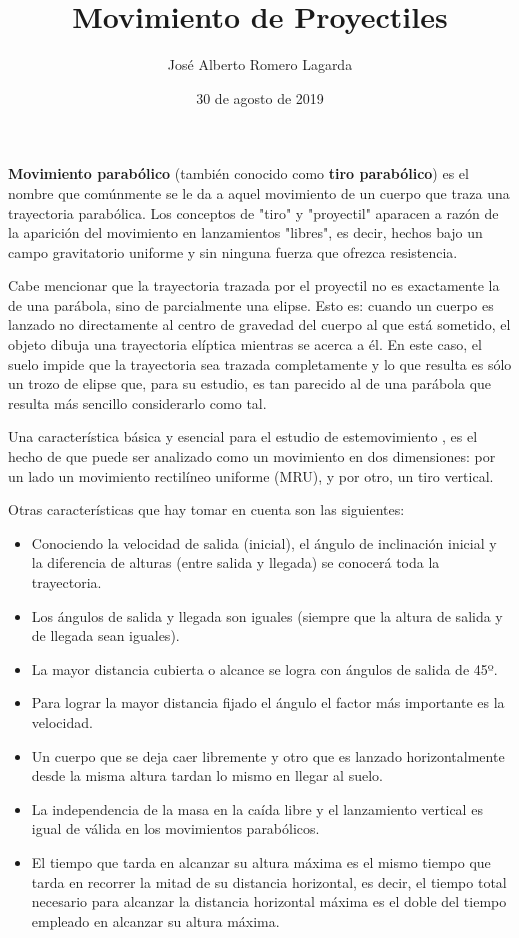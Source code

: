 \documentclass{article}
\title{\textbf{Movimiento de Proyectiles}}
\author{José Alberto Romero Lagarda}
\date{30 de agosto de 2019}
\begin{document}
\maketitle
\large
\textbf{Movimiento parabólico} (también conocido como 
\textbf{tiro parabólico}) es el nombre que comúnmente 
se le da a aquel movimiento de un cuerpo que traza una 
trayectoria parabólica. Los conceptos de "tiro" y 
"proyectil" aparacen a razón 
de la aparición del movimiento en lanzamientos "libres",
es decir, hechos bajo un campo gravitatorio uniforme y sin 
ninguna fuerza que ofrezca resistencia.

Cabe mencionar que la trayectoria trazada por el proyectil
no es exactamente la de una parábola, sino de parcialmente 
una elipse. Esto es: cuando un cuerpo es lanzado no directamente
al centro de gravedad del cuerpo al que está sometido, el objeto 
dibuja una trayectoria elíptica mientras se acerca a él. En este
caso, el suelo impide que la trayectoria sea trazada completamente
y lo que resulta es sólo un trozo de elipse que, para su estudio, 
es tan parecido al de una parábola que resulta más sencillo 
considerarlo como tal.

Una característica básica y esencial para el estudio 
de estemovimiento , es el hecho de que puede ser analizado como
un movimiento en dos dimensiones: por un lado un movimiento
rectilíneo uniforme (MRU), y por otro, un tiro vertical.

Otras características que hay tomar en cuenta son las siguientes:
\begin{itemize}
    \item Conociendo la velocidad de salida (inicial), el ángulo de inclinación inicial 
    y la diferencia de alturas (entre salida y llegada) se conocerá toda la trayectoria.
    \item Los ángulos de salida y llegada son iguales (siempre que 
    la altura de salida y de llegada sean iguales).
    \item La mayor distancia cubierta o alcance se logra con ángulos de salida de 45º.
    \item Para lograr la mayor distancia fijado el ángulo 
el factor más importante es la velocidad.
\item Un cuerpo que se deja caer libremente y otro que es lanzado 
horizontalmente desde la misma altura tardan lo mismo en llegar al suelo.
\item La independencia de la masa en la caída libre y el lanzamiento 
vertical es igual de válida en los movimientos parabólicos.
\item El tiempo que tarda en alcanzar su altura máxima es el mismo 
tiempo que tarda en recorrer la mitad de su distancia horizontal, 
es decir, el tiempo total necesario para alcanzar la distancia horizontal 
máxima es el doble del tiempo empleado en alcanzar su altura máxima.
\end{itemize}
\end{document}
